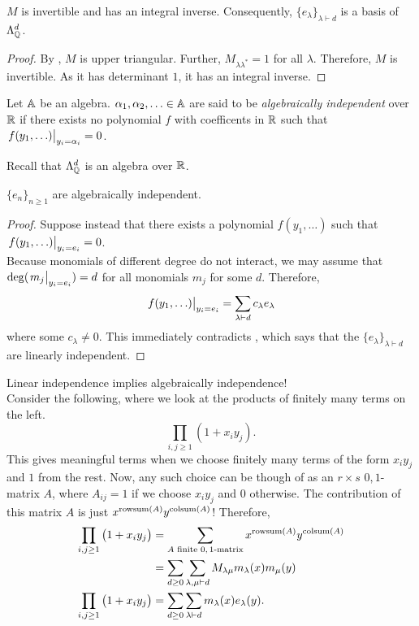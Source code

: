 	\begin{fcor}
		\label{theo: eL form basis}
		$M$ is invertible and has an integral inverse. Consequently, $\{e_\lambda\}_{\lambda \vdash d}$ is a basis of $\Lambda_{\mathbb{Q}}^d$.
	\end{fcor}
	\begin{proof}
		By , $M$ is upper triangular. Further, $M_{\lambda\lambda^*} = 1$ for all $\lambda$. Therefore, $M$ is invertible. As it has determinant $1$, it has an integral inverse.
	\end{proof}

	\begin{fdef}
		Let $\mathbb{A}$ be an algebra. $\alpha_1,\alpha_2,\ldots\in \mathbb{A}$ are said to be \emph{algebraically independent} over $\mathbb{R}$ if there exists no polynomial $f$ with coefficents in $\mathbb{R}$ such that $\left.f(y_1,\ldots)\right|_{y_i = \alpha_i} = 0$.
	\end{fdef}

	Recall that $\Lambda_{\mathbb{Q}}^d$ is an algebra over $\mathbb{R}$.

	\begin{fcor}
		\label{cor: en algebraic indep}
		$\{e_n\}_{n \ge 1}$ are algebraically independent.
	\end{fcor}
	\begin{proof}
		Suppose instead that there exists a polynomial $f(y_1,\ldots)$ such that $\left.f(y_1,\ldots)\right|_{y_i = e_i} = 0$.\\
		Because monomials of different degree do not interact, we may assume that $\deg(\left.m_j\right|_{y_i = e_i}) = d$ for all monomials $m_j$ for some $d$. Therefore,
		\[ \left.f(y_1,\ldots)\right|_{y_i = e_i} = \sum_{\lambda \vdash d} c_\lambda e_\lambda \]
		where some $c_\lambda \ne 0$. This immediately contradicts , which says that the $\{e_\lambda\}_{\lambda \vdash d}$ are linearly independent.
	\end{proof}

	Linear independence implies algebraically independence!\\

	Consider the following, where we look at the products of finitely many terms on the left.
	\[ \prod_{i,j \ge 1} \left( 1 + x_iy_j \right). \]
	This gives meaningful terms when we choose finitely many terms of the form $x_iy_j$ and $1$ from the rest. Now, any such choice can be though of as an $r \times s$ $0,1$-matrix $A$, where $A_{ij} = 1$ if we choose $x_i y_j$ and $0$ otherwise. The contribution of this matrix $A$ is just $x^{\operatorname{rowsum}(A)} y^{\operatorname{colsum}(A)}$! Therefore,
	\begin{align}
		\prod_{i,j \ge 1} \left( 1 + x_i y_j \right) &= \sum_{\text{$A$ finite $0,1$-matrix}} x^{\operatorname{rowsum}(A)} y^{\operatorname{colsum}(A)} \nonumber \\
			&= \sum_{d \ge 0} \sum_{\lambda,\mu \vdash d} M_{\lambda\mu} m_\lambda(x) m_\mu(y) \nonumber \\
		\prod_{i,j \ge 1} \left(1 + x_iy_j\right)  &= \sum_{d \ge 0} \sum_{\lambda \vdash d} m_\lambda(x) e_\lambda(y). \label{eqn: prod 1 p xi yj}
	\end{align}


